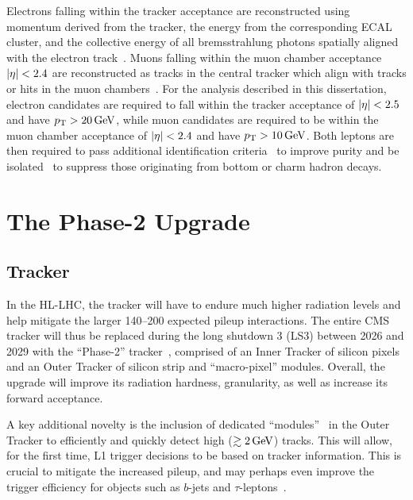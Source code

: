 Electrons falling within the tracker acceptance are reconstructed using momentum derived from the tracker, the energy from the corresponding ECAL cluster, and the collective energy of all bremsstrahlung photons spatially aligned with the electron track~\cite{Khachatryan:2015hwa}.
Muons falling within the muon chamber acceptance $\left\lvert \eta \right\rvert < 2.4$ are reconstructed as tracks in the central tracker which align with tracks or hits in the muon chambers~\cite{CMS:2018rym}. 
For the analysis described in this dissertation, electron candidates are required to fall within the tracker acceptance of $\left\lvert \eta \right\rvert < 2.5$ and have $p_\mathrm{T} > 20 \,\text{Ge\hspace{-.08em}V}$, while muon candidates are required to be within the muon chamber acceptance of $\left\lvert \eta \right\rvert < 2.4$ and have $p_\mathrm{T} > 10 \,\text{Ge\hspace{-.08em}V}$.
Both leptons are then required to pass additional identification criteria~\cite{Khachatryan:2015hwa, CMS:2018rym} to improve purity and be isolated~\cite{CMS:2017yfk} to suppress those originating from bottom or charm hadron decays.

\section{The Phase-2 Upgrade}
\label{sec:02_cms_phase2}

\subsection{Tracker}
\label{sec:02_cms_phase2_tracker}

In the HL-LHC, the tracker will have to endure much higher radiation levels and help mitigate the larger 140--200 expected pileup interactions.
The entire CMS tracker will thus be replaced during the long shutdown 3 (LS3) between 2026 and 2029 with the ``Phase-2'' tracker~\cite{CMS:2017lum}, comprised of an Inner Tracker of silicon pixels and an Outer Tracker of silicon strip and ``macro-pixel'' modules.
Overall, the upgrade will improve its radiation hardness, granularity, as well as increase its forward acceptance.

A key additional novelty is the inclusion of dedicated ``\pt modules''~\cite{foudas2005studytrackingtriggerlevel} in the Outer Tracker to efficiently and quickly detect high \pt ($\gtrsim 2\,\text{Ge\hspace{-.08em}V}$) tracks.
This will allow, for the first time, L1 trigger decisions to be based on tracker information.
This is crucial to mitigate the increased pileup, and may perhaps even improve the trigger efficiency for objects such as $b$-jets and $\tau$-leptons~\cite{chambers2023neural}.


